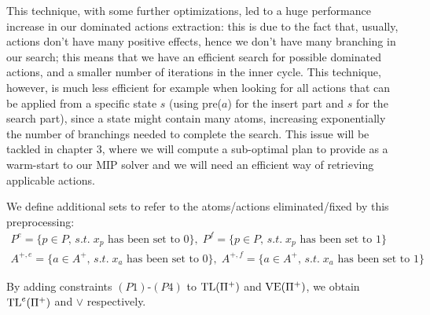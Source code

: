 This technique, with some further optimizations, led to a huge performance increase in our dominated actions extraction: this is due to the fact that, usually, actions don't have many positive effects, hence we don't have many branching in our search; this means that we have an efficient search for possible dominated actions, and a smaller number of iterations in the inner cycle. This technique, however, is much less efficient for example when looking for all actions that can be applied from a specific state $s$ (using pre($a$) for the insert part and $s$ for the search part), since a state might contain many atoms, increasing exponentially the number of branchings needed to complete the search. This issue will be tackled in chapter $3$, where we will compute a sub-optimal plan to provide as a warm-start to our MIP solver and we will need an efficient way of retrieving applicable actions.

We define additional sets to refer to the atoms/actions eliminated/fixed by this preprocessing: 
\begin{gather*}
    P^e=\{p\in P,\,s.t.\;x_p\mbox{ has been set to }0\},\;P^f=\{p\in P,\,s.t.\;x_p\mbox{ has been set to }1\}\\
    A^{+,e}=\{a\in A^+,\,s.t.\;x_a\mbox{ has been set to }0\},\;A^{+,f}=\{a\in A^+,\,s.t.\;x_a\mbox{ has been set to }1\}
\end{gather*}

By adding constraints $(P1)$-$(P4)$ to $\mbox{TL}(\Pi^+)$ and $\mbox{VE}(\Pi^+)$, we obtain $\mbox{TL}^e(\Pi^+)$ and $\vee$ respectively.